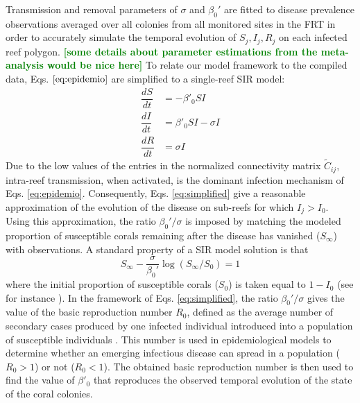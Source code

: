 \documentclass[utf8]{frontiersSCNS}
\newcommand{\erinn}[1]{\textbf{\textcolor{green}{#1}}}
\begin{document}
Transmission and removal parameters of $\sigma$ and $\beta_0'$ are fitted to disease prevalence observations averaged over all colonies from all monitored sites in the FRT in order to accurately simulate the temporal evolution of $S_j,I_j,R_j$ on each infected reef polygon. \erinn{[some details about parameter estimations from the meta-analysis would be nice here]}
To relate our model framework to the compiled data, Eqs. $\ref{eq:epidemio}$ are simplified to a single-reef SIR model:
\begin{equation}
    \begin{aligned}
        \dfrac{dS}{dt} &= -\beta'_0SI \\
        \dfrac{dI}{dt} &= \beta'_0SI - \sigma I \\
        \dfrac{dR}{dt} &= \sigma I
    \end{aligned}\label{eq:simplified}
\end{equation}
Due to the low values of the entries in the normalized connectivity matrix $\tilde{C}_{ij}$, intra-reef transmission, when activated, is the dominant infection mechanism of Eqs. \ref{eq:epidemio}. Consequently, Eqs. \ref{eq:simplified} give a reasonable approximation of the evolution of the disease on sub-reefs for which $I_j > I_0$. Using this approximation, the ratio $\beta_0'/\sigma$ is imposed by matching the modeled proportion of susceptible corals remaining after the disease has vanished ($S_\infty$) with observations. A standard property of a SIR model solution is that
\begin{equation}
    S_\infty - \frac{\sigma}{\beta_0'}\log(S_{\infty}/S_0) = 1\label{eq:ratio}
\end{equation}
where the initial proportion of susceptible corals ($S_0$) is taken equal to $1-I_0$ (see for instance \cite{Murray07}). In the framework of Eqs. \ref{eq:simplified}, the ratio $\beta_0'/\sigma$ gives the value of the basic reproduction number $R_0$, defined as the average number of secondary cases produced by one
infected individual introduced into a population of susceptible individuals \citep{keeling2007stochastic}. This
number is used in epidemiological models to determine whether an emerging infectious disease can spread in a
population ($R_0 > 1$) or not ($R_0 < 1$). The obtained basic reproduction number is then used to find the value of $\beta'_0$ that reproduces the observed temporal evolution of the state of the coral colonies.
\end{document}
